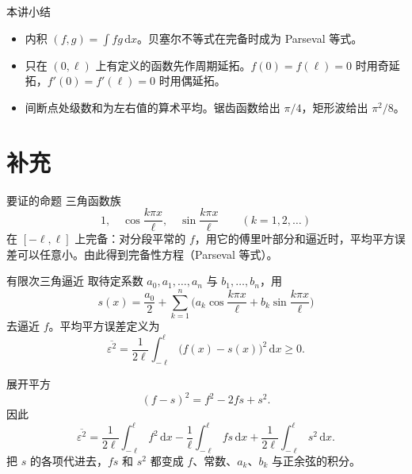 \documentclass[fontset=windows, chinese, 10pt, xcolor=dvipsnames]{beamer}
\begin{document}
\begin{frame}{本讲小结}
  \begin{itemize}
    \item 内积 $(f,g)=\int f g\,\mathrm{d}x$。贝塞尔不等式在完备时成为 Parseval 等式。
    \item 只在 $(0,\ell)$ 上有定义的函数先作周期延拓。$f(0)=f(\ell)=0$ 时用奇延拓，$f'(0)=f'(\ell)=0$ 时用偶延拓。
    \item 间断点处级数和为左右值的算术平均。锯齿函数给出 $\pi/4$，矩形波给出 $\pi^2/8$。
  \end{itemize}
\end{frame}

\appendix
\section{补充}

\begin{frame}{要证的命题}
  三角函数族
  \begin{equation*}
    1,\quad
    \cos\frac{k\pi x}{\ell},\quad
    \sin\frac{k\pi x}{\ell}
    \qquad(k=1,2,\ldots)
  \end{equation*}
  在 $[-\ell,\ell]$ 上完备：对分段平常的 $f$，用它的傅里叶部分和逼近时，平均平方误差可以任意小。由此得到完备性方程（Parseval 等式）。
\end{frame}

\begin{frame}{有限次三角逼近}
  取待定系数 $a_0,a_1,\ldots,a_n$ 与 $b_1,\ldots,b_n$，用
  \begin{equation*}
    s(x)
    =\frac{a_0}{2}
    +\sum_{k=1}^{n}
      \Biggl(
        a_k\cos\frac{k\pi x}{\ell}
        +b_k\sin\frac{k\pi x}{\ell}
      \Biggr)
  \end{equation*}
  去逼近 $f$。平均平方误差定义为
  \begin{equation*}
    \overline{\varepsilon^2}
    =\frac{1}{2\ell}\int_{-\ell}^{\ell}\bigl(f(x)-s(x)\bigr)^2\,\mathrm{d}x
    \geq 0.
  \end{equation*}
\end{frame}

\begin{frame}{展开平方}
  \begin{equation*}
    (f-s)^2
    =f^2-2f s+s^2.
  \end{equation*}
  因此
  \begin{equation*}
    \overline{\varepsilon^2}
    =\frac{1}{2\ell}\int_{-\ell}^{\ell} f^2\,\mathrm{d}x
     -\frac{1}{\ell}\int_{-\ell}^{\ell} f s\,\mathrm{d}x
     +\frac{1}{2\ell}\int_{-\ell}^{\ell} s^2\,\mathrm{d}x.
  \end{equation*}
  把 $s$ 的各项代进去，$f s$ 和 $s^2$ 都变成 $f$、常数、$a_k$、$b_k$ 与正余弦的积分。
\end{frame}
\end{document}
